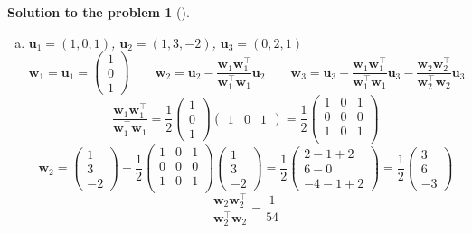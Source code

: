 \documentclass[12pt,a4]{article}
\newtheorem{solution}{Solution to the problem}
\newcommand{\bu}{{\mathbf u}}
\newcommand{\bw}{{\mathbf w}}
\begin{document}
\begin{solution}[]
\begin{enumerate}[(a)]
$\hat \bw_2 = 
\begin{pmatrix} 3/\sqrt 10 \\ -1/\sqrt 10 \end{pmatrix}$
\item $\bu_1=(1,0,1)$, $\bu_2 = (1,3,-2)$, $\bu_3=(0,2,1)$
\[
\bw_1 = \bu_1 = \begin{pmatrix} 1 \\ 0 \\ 1 \end{pmatrix}
\qquad
\bw_2 = \bu_2 - \frac{\bw_1\bw_1^\top}{\bw_1^\top\bw_1}\bu_2
\qquad
\bw_3 = \bu_3 - \frac{\bw_1\bw_1^\top}{\bw_1^\top\bw_1}\bu_3 - \frac{\bw_2\bw_2^\top}{\bw_2^\top\bw_2}\bu_3
\]
\[
\frac{\bw_1\bw_1^\top}{\bw_1^\top\bw_1} =
\frac{1}{2}
\begin{pmatrix} 
 1 \\ 0 \\ 1 
\end{pmatrix}
\begin{pmatrix}
 1 & 0 & 1
\end{pmatrix}
=
\frac{1}{2}
\begin{pmatrix} 
 1 & 0 & 1 \\
 0 & 0 & 0 \\
 1 & 0 & 1 \\
\end{pmatrix}
\]
\[
\bw_2 = 
\begin{pmatrix} 
 1 \\ 3 \\ -2
\end{pmatrix}
 - 
\frac{1}{2}
\begin{pmatrix} 
 1 & 0 & 1 \\
 0 & 0 & 0 \\
 1 & 0 & 1 \\
\end{pmatrix}
\begin{pmatrix} 
 1 \\ 3 \\ -2
\end{pmatrix}
=
\frac{1}{2}
\begin{pmatrix} 
 2 - 1 + 2\\ 6 - 0 \\ -4 - 1 + 2
\end{pmatrix}
=
\frac{1}{2}
\begin{pmatrix} 
 3 \\ 6 \\ -3
\end{pmatrix}
\]
\[
\frac{\bw_2\bw_2^\top}{\bw_2^\top\bw_2} =
\frac{1}{54}
\]
\end{enumerate}
\end{solution}
\end{document}
